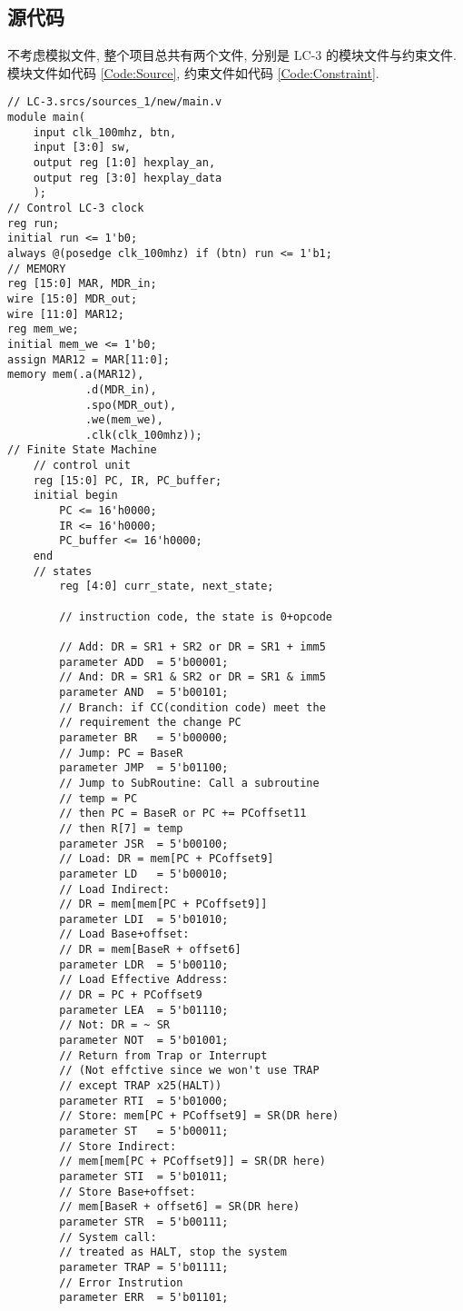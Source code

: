\documentclass[UTF8,fontset=fandol]{ctexart}
\begin{document}
\subsection*{源代码}
不考虑模拟文件, 整个项目总共有两个文件, 分别是 LC-3 的模块文件与约束文件. 模块文件如代码 \ref{Code:Source}, 约束文件如代码 \ref{Code:Constraint}.
\begin{lstlisting}[style = verilogstyle, caption = 模块文件源代码, label = Code:Source, breaklines = true]
// LC-3.srcs/sources_1/new/main.v
module main(
    input clk_100mhz, btn,
    input [3:0] sw,
    output reg [1:0] hexplay_an,
    output reg [3:0] hexplay_data
    );
// Control LC-3 clock
reg run;
initial run <= 1'b0;
always @(posedge clk_100mhz) if (btn) run <= 1'b1;
// MEMORY
reg [15:0] MAR, MDR_in;
wire [15:0] MDR_out;
wire [11:0] MAR12;
reg mem_we;
initial mem_we <= 1'b0;
assign MAR12 = MAR[11:0];
memory mem(.a(MAR12), 
            .d(MDR_in), 
            .spo(MDR_out), 
            .we(mem_we), 
            .clk(clk_100mhz));
// Finite State Machine
    // control unit
    reg [15:0] PC, IR, PC_buffer;
    initial begin
        PC <= 16'h0000;
        IR <= 16'h0000;
        PC_buffer <= 16'h0000;
    end
    // states
        reg [4:0] curr_state, next_state;
        
        // instruction code, the state is 0+opcode
        
        // Add: DR = SR1 + SR2 or DR = SR1 + imm5
        parameter ADD  = 5'b00001;
        // And: DR = SR1 & SR2 or DR = SR1 & imm5 
        parameter AND  = 5'b00101;
        // Branch: if CC(condition code) meet the
        // requirement the change PC
        parameter BR   = 5'b00000; 
        // Jump: PC = BaseR
        parameter JMP  = 5'b01100;
        // Jump to SubRoutine: Call a subroutine
        // temp = PC
        // then PC = BaseR or PC += PCoffset11
        // then R[7] = temp
        parameter JSR  = 5'b00100;
        // Load: DR = mem[PC + PCoffset9]
        parameter LD   = 5'b00010;
        // Load Indirect: 
        // DR = mem[mem[PC + PCoffset9]]
        parameter LDI  = 5'b01010;
        // Load Base+offset:
        // DR = mem[BaseR + offset6]
        parameter LDR  = 5'b00110;
        // Load Effective Address:
        // DR = PC + PCoffset9
        parameter LEA  = 5'b01110;
        // Not: DR = ~ SR
        parameter NOT  = 5'b01001;
        // Return from Trap or Interrupt
        // (Not effctive since we won't use TRAP
        // except TRAP x25(HALT))
        parameter RTI  = 5'b01000;
        // Store: mem[PC + PCoffset9] = SR(DR here)
        parameter ST   = 5'b00011;
        // Store Indirect: 
        // mem[mem[PC + PCoffset9]] = SR(DR here)
        parameter STI  = 5'b01011;
        // Store Base+offset: 
        // mem[BaseR + offset6] = SR(DR here)
        parameter STR  = 5'b00111;
        // System call:
        // treated as HALT, stop the system
        parameter TRAP = 5'b01111;
        // Error Instrution
        parameter ERR  = 5'b01101;
        

\end{lstlisting}
\end{document}
